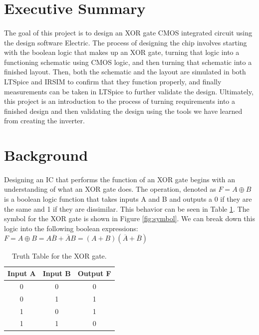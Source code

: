\documentclass{article}
\begin{document}



\tableofcontents

\newpage
{}

\section{Executive Summary}
  \paragraph{}
  The goal of this project is to design an XOR gate CMOS integrated circuit using the design software Electric. The process of designing the chip involves starting with the boolean logic that makes up an XOR gate, turning that logic into a functioning schematic using CMOS logic, and then turning that schematic into a finished layout. Then, both the schematic and the layout are simulated in both LTSpice and IRSIM to confirm that they function properly, and finally measurements can be taken in LTSpice to further validate the design. Ultimately, this project is an introduction to the process of turning requirements into a finished design and then validating the design using the tools we have learned from creating the inverter.

\section{Background}
  \paragraph{}
  Designing an IC that performs the function of an XOR gate begins with an understanding of what an XOR gate does. The operation, denoted as $F=A \oplus B$ is a boolean logic function that takes inputs A and B and outputs a 0 if they are the same and 1 if they are dissimilar. This behavior can be seen in Table \ref{table:xor}. The symbol for the XOR gate is shown in Figure \ref{fig:symbol}. We can break down this logic into the following boolean expressions: $F=A \oplus B = A\overline{B}+\overline{A}B=(A+B)(\overline{A}+\overline{B})$


  \begin{table}[H]
    \centering
    \footnotesize
    \begin{tabular}{|c|c|c|}
      \hline
      \textbf{Input A} & \textbf{Input B} & \textbf{Output F} \\
      \hline
      0 & 0 & 0 \\
      \hline
      0 & 1 & 1 \\
      \hline
      1 & 0 & 1 \\
      \hline
      1 & 1 & 0 \\
      \hline
    \end{tabular}
    \caption{Truth Table for the XOR gate.}
    \label{table:xor}
  \end{table}
\end{document}
